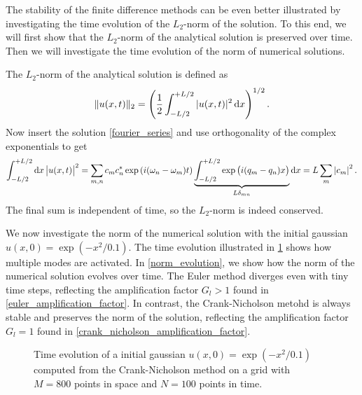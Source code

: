 
The stability of the finite difference methods can be even better illustrated by investigating the time evolution of the $L_2$-norm of the solution.
To this end, we will first show that the $L_2$-norm of the analytical solution is preserved over time.
Then we will investigate the time evolution of the norm of numerical solutions.

The $L_2$-norm of the analytical solution is defined as
\begin{equation*}
	\Vert u(x,t) \Vert_2 = \left( \frac{1}{2} \int_{-L/2}^{+L/2} |u(x,t)|^2 \dif x \right)^{1/2}.
\end{equation*}
Now insert the solution \ref{fourier_series} and use orthogonality of the complex exponentials to get
\begin{equation*}
\int_{-L/2}^{+L/2} \dif x \left| u(x,t) \right|^2 = \sum_{m,n} c_m c_n^* \exp{(i(\omega_n-\omega_m)t)} \underbrace{\int_{-L/2}^{+L/2} \exp{\left(i(q_m-q_n)x\right)}}_{L \delta_{m n}} \dif x = L \sum_m \left| c_m \right|^2.
\end{equation*}
The final sum is independent of time, so the $L_2$-norm is indeed conserved.

We now investigate the norm of the numerical solution with the initial gaussian $u(x, 0) = \exp \left( -x^2 / 0.1 \right)$.
The time evolution illustrated in \cref{gaussian_evolution} shows how multiple modes are activated.
In \cref{norm_evolution}, we show how the norm of the numerical solution evolves over time.
The Euler method diverges even with tiny time steps, reflecting the amplification factor $G_l > 1$ found in \cref{euler_amplification_factor}.
In contrast, the Crank-Nicholson metohd is always stable and preserves the norm of the solution, reflecting the amplification factor $G_l = 1$ found in \cref{crank_nicholson_amplification_factor}.

\begin{figure}[t]
\centering
{}
\caption{\label{gaussian_evolution}Time evolution of a initial gaussian $u(x,0)=\exp(-x^2/0.1)$ computed from the Crank-Nicholson method on a grid with $M=800$ points in space and $N=100$ points in time.}
\end{figure}

